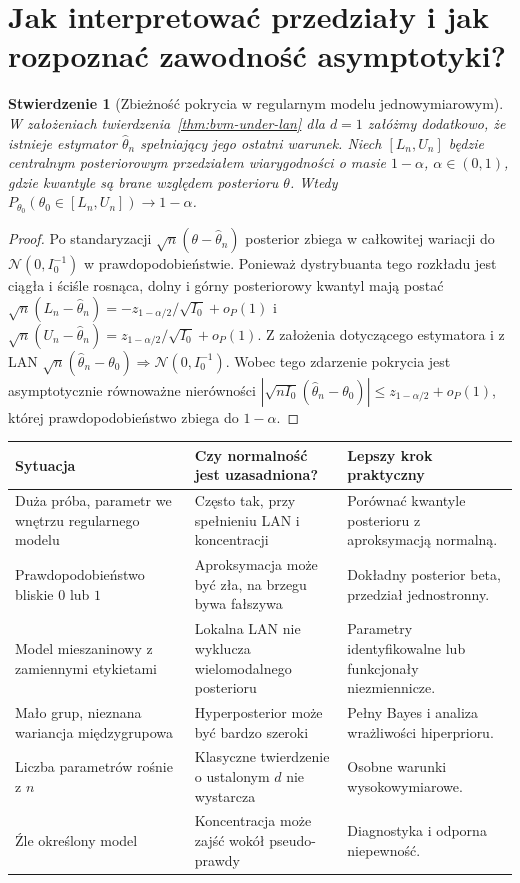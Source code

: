 \documentclass[11pt,a4paper,oneside]{report}
\numberwithin{equation}{chapter}
\theoremstyle{plain}
\newtheorem{stwierdzenie}[twierdzenie]{Stwierdzenie}
\theoremstyle{definition}
\theoremstyle{remark}
\newcommand{\Normal}{\mathcal N}
\begin{document}
\section{Jak interpretować przedziały i jak rozpoznać zawodność asymptotyki?}
\begin{stwierdzenie}[Zbieżność pokrycia w regularnym modelu jednowymiarowym]
\label{prop:credible-frequentist-coverage}
W założeniach twierdzenia~\ref{thm:bvm-under-lan} dla $d=1$
załóżmy dodatkowo, że istnieje estymator
$\widehat\theta_n$ spełniający jego ostatni warunek.
Niech $[L_n,U_n]$ będzie centralnym posteriorowym
przedziałem wiarygodności o masie $1-\alpha$,
$\alpha\in(0,1)$, gdzie kwantyle są brane względem
posterioru $\theta$.
Wtedy $P_{\theta_0}(\theta_0\in[L_n,U_n])\to1-\alpha$.
\end{stwierdzenie}
\begin{proof}
Po standaryzacji $\sqrt n(\theta-\widehat\theta_n)$
posterior zbiega w całkowitej wariacji do
$\Normal(0,I_0^{-1})$ w prawdopodobieństwie.
Ponieważ dystrybuanta tego rozkładu jest ciągła i ściśle
rosnąca, dolny i górny posteriorowy kwantyl mają postać
$\sqrt n(L_n-\widehat\theta_n)
 =-z_{1-\alpha/2}/\sqrt{I_0}+o_P(1)$ i
$\sqrt n(U_n-\widehat\theta_n)
 = z_{1-\alpha/2}/\sqrt{I_0}+o_P(1)$.
Z założenia dotyczącego estymatora i z LAN
$\sqrt n(\widehat\theta_n-\theta_0)
 \Rightarrow\Normal(0,I_0^{-1})$.
Wobec tego zdarzenie pokrycia jest asymptotycznie
równoważne nierówności
$|\sqrt{nI_0}(\widehat\theta_n-\theta_0)|
 \le z_{1-\alpha/2}+o_P(1)$, której prawdopodobieństwo
zbiega do $1-\alpha$.
\end{proof}

\begin{center}\small
\begin{tabular}{>{\raggedright\arraybackslash}p{}>{\raggedright\arraybackslash}p{}>{\raggedright\arraybackslash}p{}}
\toprule
\textbf{Sytuacja} & \textbf{Czy normalność jest uzasadniona?} & \textbf{Lepszy krok praktyczny}\\
\midrule
Duża próba, parametr we wnętrzu regularnego modelu & Często tak, przy spełnieniu LAN i koncentracji & Porównać kwantyle posterioru z aproksymacją normalną.\\
Prawdopodobieństwo bliskie $0$ lub $1$ & Aproksymacja może być zła, na brzegu bywa fałszywa & Dokładny posterior beta, przedział jednostronny.\\
Model mieszaninowy z zamiennymi etykietami & Lokalna LAN nie wyklucza wielomodalnego posterioru & Parametry identyfikowalne lub funkcjonały niezmiennicze.\\
Mało grup, nieznana wariancja międzygrupowa & Hyperposterior może być bardzo szeroki & Pełny Bayes i analiza wrażliwości hiperprioru.\\
Liczba parametrów rośnie z $n$ & Klasyczne twierdzenie o ustalonym $d$ nie wystarcza & Osobne warunki wysokowymiarowe.\\
Źle określony model & Koncentracja może zajść wokół pseudo-prawdy & Diagnostyka i odporna niepewność.\\
\bottomrule
\end{tabular}
\end{center}
\end{document}
